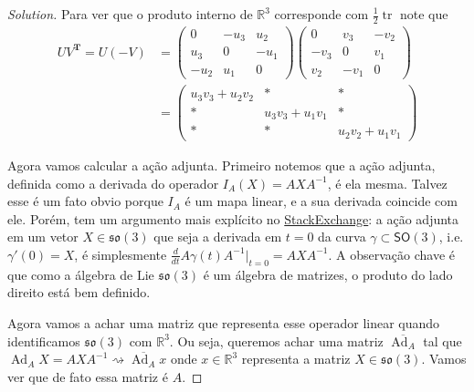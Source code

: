 \begin{proof}[Solution]
Para ver que o produto interno de $\mathbb{R}^{3}$ corresponde com $\frac{1}{2}\operatorname{tr}$ note que
\begin{align*}
	UV^{\mathbf{T}}=U(-V)&=\begin{pmatrix} 0&-u_3&u_2\\u_3&0&-u_1\\-u_2&u_1&0 \end{pmatrix} \begin{pmatrix} 0&v_3&-v_2\\-v_3&0&v_1\\v_2&-v_1&0 \end{pmatrix} \\
		       &=\begin{pmatrix} u_3v_3+u_2v_2&*&*\\ *&u_3v_3+u_1v_1&*\\ *&*&u_2v_2+u_1v_1 \end{pmatrix} 
\end{align*}

\item Agora vamos calcular a ação adjunta. 
Primeiro notemos que a ação adjunta, definida como a derivada do operador $I_A(X)=AXA^{-1}$, é ela mesma. Talvez esse é um fato obvio porque $I_A$  é um mapa linear, e a sua derivada coincide com ele. Porém, tem um argumento mais explícito no \href{https://math.stackexchange.com/questions/512026/prove-that-the-action-of-a-lie-group-on-its-lie-algebra-via-the-adjoint-represen}{StackExchange}: a ação adjunta em um vetor  $X\in\mathfrak{so}(3)$ que seja a derivada em $t=0$ da curva $\gamma\subset \mathsf{SO}(3)$, i.e.  $\gamma'(0)=X$, é simplesmente $\frac{d}{dt}A\gamma(t)A^{-1}\Big|_{t=0}=AXA^{-1}$. A observação chave é que como a álgebra de Lie $\mathfrak{so}(3)$ é um álgebra de matrizes, o produto do lado direito está bem definido.

Agora vamos a achar uma matriz que representa esse operador linear quando identificamos $\mathfrak{so}(3)$ com $\mathbb{R}^{3}$. Ou seja, queremos achar uma matriz  $\overline{\operatorname{Ad}_A}$ tal que $\operatorname{Ad}_AX=AXA^{-1}\rightsquigarrow \overline{\operatorname{Ad}_A}x$ onde $x\in\mathbb{R}^{3}$  representa a matriz $X\in\mathfrak{so}(3)$. Vamos ver que de fato essa matriz é $A$.


\end{proof}
